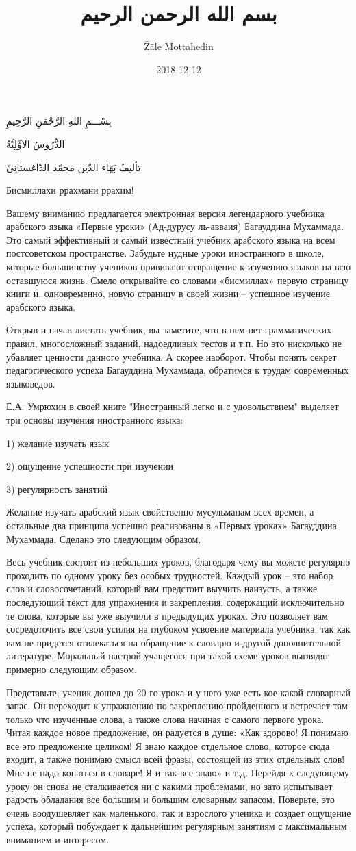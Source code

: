 \documentclass[a5paper]{article}
\title{بسم الله الرحمن الرحيم}
\author{Žāle Mottahedin}
\date{2018-12-12}
\begin{document}
بِسْـــمِ اللهِ الرَّحْمَنِ الرَّحِيمِ

الدُّرُوسُ الاَوَّلِيَّةُ

تأليفُ بَهَاء الدّين محمّد الدّاغستانِىِّ

Бисмиллахи ррахмани ррахим!

Вашему вниманию предлагается электронная версия легендарного учебника арабского языка «Первые уроки» (Ад-дурусу ль-авваия) Багауддина Мухаммада. Это самый эффективный и самый известный учебник арабского языка на всем постсоветском пространстве. Забудьте нудные уроки иностранного в школе, которые большинству учеников прививают отвращение к изучению языков на всю оставшуюся жизнь. Смело открывайте со словами «бисмиллах» первую страницу книги и, одновременно, новую страницу в своей жизни – успешное изучение арабского языка. 

Открыв и начав листать учебник, вы заметите, что в нем нет грамматических правил, многосложный заданий, надоедливых тестов и т.п. Но это нисколько не убавляет ценности данного учебника. А скорее наоборот. Чтобы понять секрет педагогического успеха Багауддина Мухаммада, обратимся к трудам современных языковедов.

Е.А. Умрюхин в своей книге "Иностранный легко и с удовольствием" выделяет три основы изучения иностранного языка: 

1) желание изучать язык 

2) ощущение успешности при изучении 

3) регулярность занятий

Желание изучать арабский язык свойственно мусульманам всех времен, а остальные два принципа успешно реализованы в «Первых уроках» Багауддина Мухаммада. Сделано это следующим образом.

Весь учебник состоит из небольших уроков, благодаря чему вы можете регулярно проходить по одному уроку без особых трудностей. Каждый урок – это набор слов и словосочетаний, который вам предстоит выучить наизусть, а также последующий текст для упражнения и закрепления, содержащий исключительно те слова, которые вы уже выучили в предыдущих уроках. Это позволяет вам сосредоточить все свои усилия на глубоком усвоение материала учебника, так как вам не придется отвлекаться на обращение к словарю и другой дополнительной литературе. Моральный настрой учащегося при такой схеме уроков выглядят примерно следующим образом.

Представьте, ученик дошел до 20-го урока и у него уже есть кое-какой словарный запас. Он переходит к упражнению по закреплению пройденного и встречает там только что изученные слова, а также слова начиная с самого первого урока. Читая каждое новое предложение, он радуется в душе: «Как здорово! Я понимаю все это предложение целиком! Я знаю каждое отдельное слово, которое сюда входит, а также понимаю смысл всей фразы, состоящей из этих отдельных слов! Мне не надо копаться в словаре! Я и так все знаю» и т.д. Перейдя к следующему уроку он снова не сталкивается ни с какими проблемами, но зато испытывает радость обладания все большим и большим словарным запасом. Поверьте, это очень воодушевляет как маленького, так и взрослого ученика и создает ощущение успеха, который побуждает к дальнейшим регулярным занятиям с максимальным вниманием и интересом.
\end{document}
